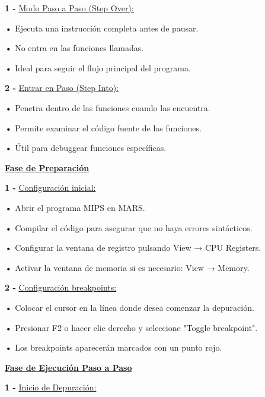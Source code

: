\documentclass{article}
\begin{document}
\quad

\textbf{1 -  } {\underline{ Modo Paso a Paso (Step Over):}}

\quad

\textbf{•   } { Ejecuta una instrucción completa antes de pausar.}

\textbf{•   } { No entra en las funciones llamadas.}

\textbf{•   } { Ideal para seguir el flujo principal del programa.}

\quad

\textbf{2 -  } {\underline{ Entrar en Paso (Step Into):}}

\quad

\textbf{•   } { Penetra dentro de las funciones cuando las encuentra.}

\textbf{•   } { Permite examinar el código fuente de las funciones.}

\textbf{•   } { Útil para debuggear funciones específicas.}



\quad

\textbf{\underline{Fase de Preparación}}

\quad

\textbf{1 -  } {\underline{ Configuración inicial:}}

\quad

\textbf{•   } { Abrir el programa MIPS en MARS.}

\textbf{•   } { Compilar el código para asegurar que no haya errores sintácticos.}

\textbf{•   } { Configurar la ventana de registro pulsando View → CPU Registers.}

\textbf{•   } { Activar la ventana de memoria si es necesario: View → Memory.}

\quad

\textbf{2 -  } {\underline{ Configuración breakpoints:}}

\quad

\textbf{•   } { Colocar el cursor en la línea donde desea comenzar la depuración.}

\textbf{•   } { Presionar F2 o hacer clic derecho y seleccione "Toggle breakpoint".}

\textbf{•   } { Los breakpoints aparecerán marcados con un punto rojo.}

\quad

\textbf{\underline{Fase de Ejecución Paso a Paso}}

\quad

\textbf{1 -  } {\underline{ Inicio de Depuración:}}
\end{document}
